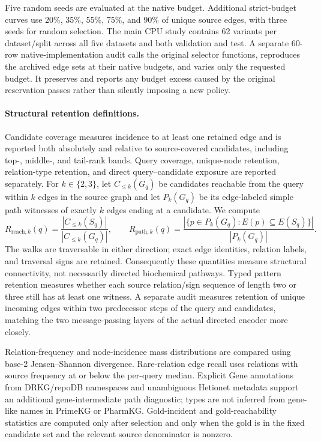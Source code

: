 Five random seeds are evaluated at the native budget. Additional strict-budget
curves use 20\%, 35\%, 55\%, 75\%, and 90\% of unique source edges, with three
seeds for random selection. The main CPU study contains 62 variants per
dataset/split across all five datasets and both validation and test. A separate
60-row native-implementation audit calls the original selector functions,
reproduces the archived edge sets at their native budgets, and varies only the
requested budget. It preserves and reports any budget excess caused by the
original reservation passes rather than silently imposing a new policy.

\paragraph{Structural retention definitions.}
Candidate coverage measures incidence to at least one retained edge and is
reported both absolutely and relative to source-covered candidates, including
top-, middle-, and tail-rank bands. Query coverage, unique-node retention,
relation-type retention, and direct query--candidate exposure are reported
separately. For $k\in\{2,3\}$, let $C_{\leq k}(G_q)$ be candidates reachable from
the query within $k$ edges in the source graph and let $P_k(G_q)$ be its
edge-labeled simple path witnesses of exactly $k$ edges ending at a candidate.
We compute
\[
 R_{\mathrm{reach},k}(q)=
 \frac{|C_{\leq k}(S_q)|}{|C_{\leq k}(G_q)|},\qquad
 R_{\mathrm{path},k}(q)=
 \frac{|\{p\in P_k(G_q):E(p)\subseteq E(S_q)\}|}{|P_k(G_q)|}.
\]
The walks are traversable in either direction; exact edge identities, relation
labels, and traversal signs are retained. Consequently these quantities measure
structural connectivity, not necessarily directed biochemical pathways. Typed
pattern retention measures whether each source relation/sign sequence of
length two or three still has at least one witness. A separate audit measures
retention of unique incoming edges within two predecessor steps of the query
and candidates, matching the two message-passing layers of the actual directed
encoder more closely.

Relation-frequency and node-incidence mass distributions are compared using
base-2 Jensen--Shannon divergence. Rare-relation edge recall uses relations with
source frequency at or below the per-query median. Explicit Gene annotations
from DRKG/repoDB namespaces and unambiguous Hetionet metadata support an
additional gene-intermediate path diagnostic; types are not inferred from
gene-like names in PrimeKG or PharmKG. Gold-incident and gold-reachability
statistics are computed only after selection and only when the gold is in the
fixed candidate set and the relevant source denominator is nonzero.

